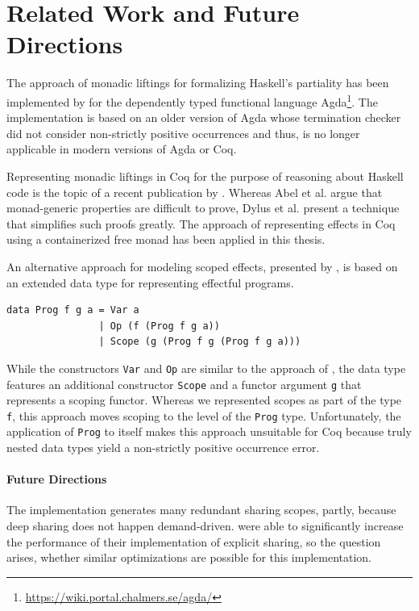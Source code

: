 \documentclass[a4paper, 11pt, fleqn, twoside, abstract=on]{scrreprt}
\newcommand{\hinl}[1]{\texttt{#1}}
\newcommand{\cinl}[1]{\texttt{#1}}
\begin{document}
\section{Related Work and Future Directions}

The approach of monadic liftings for formalizing Haskell's partiality has been implemented by \citet{abel2005verifying} for the dependently typed functional language Agda\footnote{\url{https://wiki.portal.chalmers.se/agda/}}.
The implementation is based on an older version of Agda whose termination checker did not consider non-strictly positive occurrences and thus, is no longer applicable in modern versions of Agda or Coq.

Representing monadic liftings in Coq for the purpose of reasoning about Haskell code is the topic of a recent publication by \citet{dylus2019oneMonad}.
Whereas Abel et al. argue that monad-generic properties are difficult to prove, Dylus et al. present a technique that simplifies such proofs greatly.
The approach of representing effects in Coq using a containerized free monad has been applied in this thesis.

An alternative approach for modeling scoped effects, presented by \citet{pirog2018syntax}, is based on an extended data type for representing effectful programs.

\begin{verbatim}
data Prog f g a = Var a
                | Op (f (Prog f g a))
                | Scope (g (Prog f g (Prog f g a)))
\end{verbatim}

While the constructors \hinl{Var} and \hinl{Op} are similar to the approach of \citet{wu2014effect}, the data type features an additional constructor \hinl{Scope} and a functor argument \hinl{g} that represents a scoping functor.
Whereas we represented scopes as part of the type \cinl{f}, this approach moves scoping to the level of the \hinl{Prog} type.
Unfortunately, the application of \hinl{Prog} to itself makes this approach unsuitable for Coq because truly nested data types yield a non-strictly positive occurrence error.

\paragraph{Future Directions}

The implementation generates many redundant sharing scopes, partly, because deep sharing does not happen demand-driven.
\citet{fischer2009purely} were able to significantly increase the performance of their implementation of explicit sharing, so the question arises, whether similar optimizations are possible for this implementation.
\end{document}
